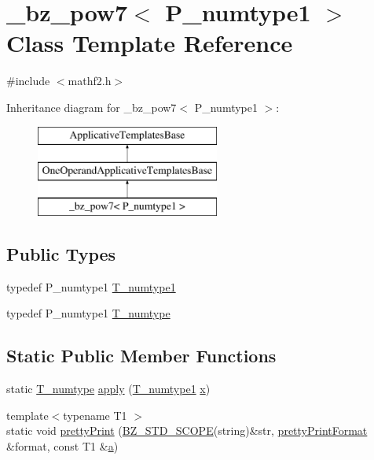 \hypertarget{class__bz__pow7}{}\section{\+\_\+bz\+\_\+pow7$<$ P\+\_\+numtype1 $>$ Class Template Reference}
\label{class__bz__pow7}


{\ttfamily \#include $<$mathf2.\+h$>$}

Inheritance diagram for \+\_\+bz\+\_\+pow7$<$ P\+\_\+numtype1 $>$\+:\begin{figure}[H]
\begin{center}
\leavevmode
\includegraphics[height=3.000000cm]{class__bz__pow7}
\end{center}
\end{figure}
\subsection*{Public Types}
\begin{DoxyCompactItemize}
\item 
typedef P\+\_\+numtype1 \hyperlink{class__bz__pow7_a74ff188d9e973992f0f4d827f64a85e7}{T\+\_\+numtype1}
\item 
typedef P\+\_\+numtype1 \hyperlink{class__bz__pow7_a133aeb45ae940f752d95808e44289cc1}{T\+\_\+numtype}
\end{DoxyCompactItemize}
\subsection*{Static Public Member Functions}
\begin{DoxyCompactItemize}
\item 
static \hyperlink{class__bz__pow7_a133aeb45ae940f752d95808e44289cc1}{T\+\_\+numtype} \hyperlink{class__bz__pow7_ae5989119bc011e595a8419c7022f2d9b}{apply} (\hyperlink{class__bz__pow7_a74ff188d9e973992f0f4d827f64a85e7}{T\+\_\+numtype1} \hyperlink{vecnorm1_8cc_ac73eed9e41ec09d58f112f06c2d6cb63}{x})
\item 
{\footnotesize template$<$typename T1 $>$ }\\static void \hyperlink{class__bz__pow7_adccb95dbb6d2803e7b89ef335cc9f83c}{pretty\+Print} (\hyperlink{numinquire_8h_a2b24ffc3b4ef9803956bc7715c6c7b83}{B\+Z\+\_\+\+S\+T\+D\+\_\+\+S\+C\+O\+P\+E}(string)\&str, \hyperlink{classprettyPrintFormat}{pretty\+Print\+Format} \&format, const T1 \&\hyperlink{gen__mat5files_8m_aae328bf20413f220e38aec4d95bfd6da}{a})
\end{DoxyCompactItemize}


